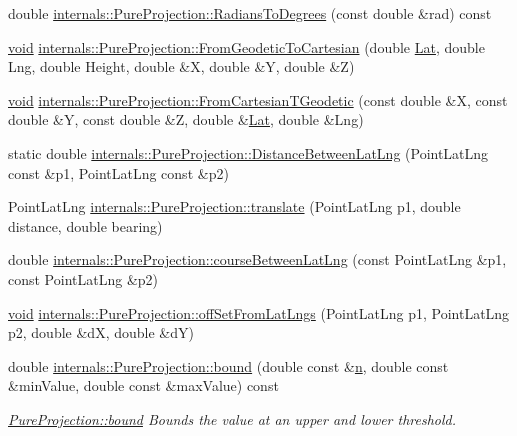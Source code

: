 \begin{DoxyCompactItemize}
double \hyperlink{group___o_p_map_widget_ga61454b50ff7258a201eb43229885c8f3}{internals\-::\-Pure\-Projection\-::\-Radians\-To\-Degrees} (const double \&rad) const 
\item 
\hyperlink{group___u_a_v_objects_plugin_ga444cf2ff3f0ecbe028adce838d373f5c}{void} \hyperlink{group___o_p_map_widget_gadbd11323a9e1396fefe06cdf8bf4755d}{internals\-::\-Pure\-Projection\-::\-From\-Geodetic\-To\-Cartesian} (double \hyperlink{_o_p_plots_8m_afdc4c4bc9859d268f8b5d1cc44b8ab7c}{\-Lat}, double \-Lng, double \-Height, double \&\-X, double \&\-Y, double \&\-Z)
\item 
\hyperlink{group___u_a_v_objects_plugin_ga444cf2ff3f0ecbe028adce838d373f5c}{void} \hyperlink{group___o_p_map_widget_ga872656fbcb1b34b5888a600e4782db13}{internals\-::\-Pure\-Projection\-::\-From\-Cartesian\-T\-Geodetic} (const double \&\-X, const double \&\-Y, const double \&\-Z, double \&\hyperlink{_o_p_plots_8m_afdc4c4bc9859d268f8b5d1cc44b8ab7c}{\-Lat}, double \&\-Lng)
\item 
static double \hyperlink{group___o_p_map_widget_ga2dd7d98a1173081e9e81f2acb088f382}{internals\-::\-Pure\-Projection\-::\-Distance\-Between\-Lat\-Lng} (\-Point\-Lat\-Lng const \&p1, \-Point\-Lat\-Lng const \&p2)
\item 
\-Point\-Lat\-Lng \hyperlink{group___o_p_map_widget_gae41a7a74d45f66fa61c622f0838827ae}{internals\-::\-Pure\-Projection\-::translate} (\-Point\-Lat\-Lng p1, double distance, double bearing)
\item 
double \hyperlink{group___o_p_map_widget_ga2b6a72edc701752748d62a513aea828b}{internals\-::\-Pure\-Projection\-::course\-Between\-Lat\-Lng} (const \-Point\-Lat\-Lng \&p1, const \-Point\-Lat\-Lng \&p2)
\item 
\hyperlink{group___u_a_v_objects_plugin_ga444cf2ff3f0ecbe028adce838d373f5c}{void} \hyperlink{group___o_p_map_widget_gaa4efe3b7598311215c44e7a0f47df531}{internals\-::\-Pure\-Projection\-::off\-Set\-From\-Lat\-Lngs} (\-Point\-Lat\-Lng p1, \-Point\-Lat\-Lng p2, double \&d\-X, double \&d\-Y)
\item 
double \hyperlink{group___o_p_map_widget_ga0a978f088a3c28b59ce7bdf4ac3ab238}{internals\-::\-Pure\-Projection\-::bound} (double const \&\hyperlink{_o_p_plots_8m_a1ee0621678c54afffb4b6e50f10c9ab8}{n}, double const \&min\-Value, double const \&max\-Value) const 
\begin{DoxyCompactList}\small\item\em \hyperlink{group___o_p_map_widget_ga0a978f088a3c28b59ce7bdf4ac3ab238}{\-Pure\-Projection\-::bound} \-Bounds the value at an upper and lower threshold. \end{DoxyCompactList}\item 

\end{DoxyCompactItemize}
